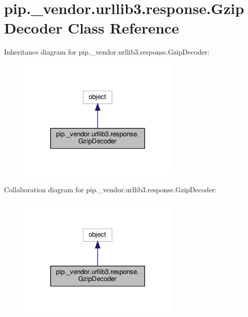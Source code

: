 \hypertarget{classpip_1_1__vendor_1_1urllib3_1_1response_1_1GzipDecoder}{}\section{pip.\+\_\+vendor.\+urllib3.\+response.\+Gzip\+Decoder Class Reference}
\label{classpip_1_1__vendor_1_1urllib3_1_1response_1_1GzipDecoder}


Inheritance diagram for pip.\+\_\+vendor.\+urllib3.\+response.\+Gzip\+Decoder\+:
\nopagebreak
\begin{figure}[H]
\begin{center}
\leavevmode
\includegraphics[width=221pt]{classpip_1_1__vendor_1_1urllib3_1_1response_1_1GzipDecoder__inherit__graph}
\end{center}
\end{figure}


Collaboration diagram for pip.\+\_\+vendor.\+urllib3.\+response.\+Gzip\+Decoder\+:
\nopagebreak
\begin{figure}[H]
\begin{center}
\leavevmode
\includegraphics[width=221pt]{classpip_1_1__vendor_1_1urllib3_1_1response_1_1GzipDecoder__coll__graph}
\end{center}
\end{figure}
